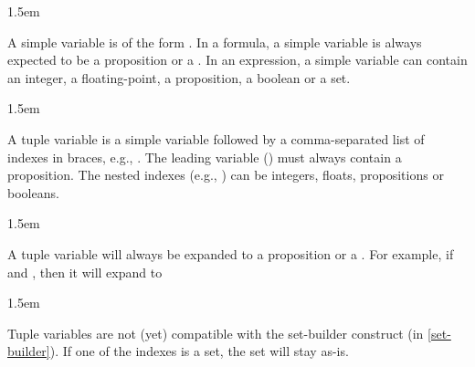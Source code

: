 \begin{mddefinitions}%


\begin{mdbmarginx}{}{}{}{1.5em}%
\begin{mddefdata}%
A simple variable is of the form . In a formula, a simple
variable is always expected to be a proposition or a
. In an expression, a simple
variable can contain an integer, a floating-point, a proposition, a boolean
or a set.
\end{mddefdata}%
\end{mdbmarginx}%


\begin{mdbmarginx}{}{}{}{1.5em}%
\begin{mddefdata}%
A tuple variable is a simple variable followed by a comma-separated list of
indexes in braces, e.g., . The leading variable ()
must always contain a proposition. The nested indexes (e.g., )
can be integers, floats, propositions or booleans.
\end{mddefdata}%
\end{mdbmarginx}%

\begin{mdbmarginx}{}{}{}{1.5em}%
\begin{mddefdata}%
A tuple variable will always be expanded to a proposition or a
. For example, if
 and , then it will expand to 
\end{mddefdata}%
\end{mdbmarginx}%

\begin{mdbmarginx}{}{}{}{1.5em}%
\begin{mddefdata}%
Tuple variables are not (yet) compatible with the set-builder construct (in
\ref{set-builder}). If one of the indexes is a set, the set will stay
as-is.%
\end{mddefdata}%
\end{mdbmarginx}%
\end{mddefinitions}%

